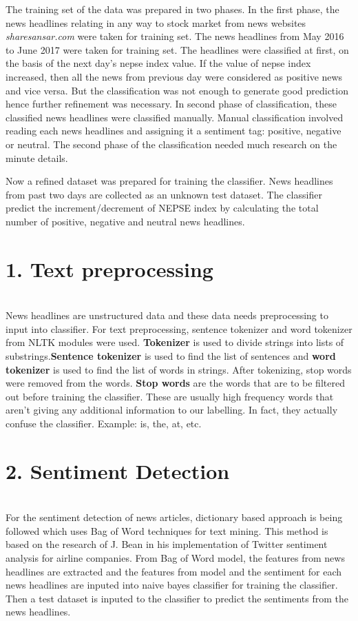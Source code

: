 The training set of the data was prepared in two phases. In the first phase, the news headlines relating in any way to stock market from news websites \textit{sharesansar.com} were taken for training set. The news headlines from May 2016 to June 2017 were taken for training set. The headlines were classified at first, on the basis of the next day's nepse index value. If the value of nepse index increased, then all the news from previous day were considered as positive news and vice versa.  But the classification was not enough to generate good prediction hence further refinement was necessary. In second phase of classification, these classified news headlines were classified manually. Manual classification involved reading each news headlines and assigning it a sentiment tag: positive, negative or neutral. The second phase of the classification needed much research on the minute details. 

Now a refined dataset was prepared for training the classifier. News headlines from past two days are collected as an unknown test dataset. The classifier predict the increment/decrement of NEPSE index by calculating the total number of positive, negative and neutral news headlines.

\chapter{\textbf{1. Text preprocessing}} \\
News headlines are unstructured data and these data needs preprocessing to input into classifier. For text preprocessing, sentence tokenizer and word tokenizer from NLTK modules were used. \textbf{Tokenizer} is used to divide strings into lists of substrings.\textbf{Sentence tokenizer} is used to find the list of sentences and \textbf{word tokenizer} is used to find the list of words in strings. After tokenizing, stop words were removed from the words. \textbf{Stop words} are the words that are to be filtered out before training the classifier. These are usually high frequency words that aren't giving any additional information to our labelling. In fact, they actually confuse the classifier. Example: is, the, at, etc.

\chapter{\textbf{2. Sentiment Detection}}  \\
\cite{na} For the sentiment detection of news articles, dictionary based approach is being followed which uses Bag of Word techniques for text mining. This method is based on the research of \cite{jb} J. Bean in his implementation of Twitter sentiment analysis for airline companies. From Bag of Word model, the features from news headlines are extracted and the features from model and the sentiment for each news headlines are inputed into naive bayes classifier for training the classifier. Then a test dataset is inputed to the classifier to predict the sentiments from the news headlines.

